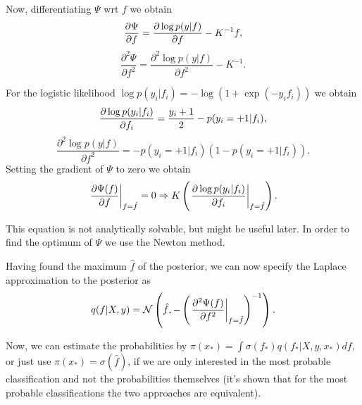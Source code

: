 		Now, differentiating $\Psi$ wrt $f$ we obtain
		$$\frac{\partial \Psi}{\partial f} = \frac{\partial \log p(y | f)}{\partial f} - K^{-1} f,$$
		$$\frac{\partial^2\Psi}{\partial f^2} = \frac{\partial^2 \log p(y | f)}{\partial f^2} - K^{-1}.$$

		For the logistic likelihood $\log p(y_i | f_i) = -\log (1 + \exp(-y_i f_i))$ we obtain
		$$\frac{\partial \log p(y_i | f_i)}{\partial f_i} = \frac {y_i + 1} 2 - p(y_i = +1 | f_i),$$
		$$\frac{\partial^2 \log p(y | f)}{\partial f^2} = - p(y_i = +1 | f_i)(1 - p(y_i = +1 | f_i)).$$
		Setting the gradient of $\Psi$ to zero we obtain
		\begin{equation}
			\label{laplace_method_opt_derivative}
			\left.\frac{\partial \Psi(f)}{\partial f}\right|_{f = \hat f} = 0 \Rightarrow K\left(\left.\frac{\partial \log p(y_i | f_i)}{\partial f_i}\right|_{f = \hat f}\right).
		\end{equation}

		This equation is not analytically solvable, but might be useful later. In order to find the optimum of $\Psi$ we use the Newton method.

		Having found the maximum $\hat f$ of the posterior, we can now specify the Laplace approximation to the posterior as 
		$$q(f | X, y) = \mathcal{N} \left(\hat f, - \left(\left. \frac{\partial^2 \Psi(f)}{\partial f^2} \right|_{f = \hat f}\right)^{-1}\right).$$

		Now, we can estimate the probabilities by
		$\pi(x_*) = \int \sigma(f_*) q(f_* | X, y, x_*) df,$
		or just use $\pi(x_*) = \sigma(\hat f)$, if we are only interested in the most probable classification and not the probabilities themselves (it's shown that for the most probable classifications the two approaches are equivalent).